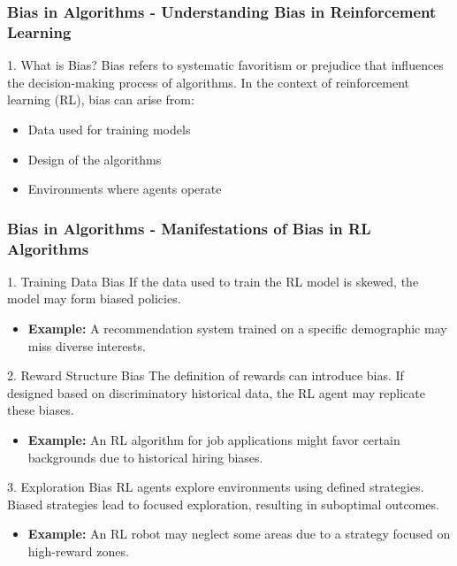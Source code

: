 \documentclass[aspectratio=169]{beamer}
\begin{document}
\begin{frame}[fragile]
  \frametitle{Bias in Algorithms - Understanding Bias in Reinforcement Learning}
  
  \begin{block}{1. What is Bias?}
    Bias refers to systematic favoritism or prejudice that influences the decision-making process of algorithms. In the context of reinforcement learning (RL), bias can arise from:
    \begin{itemize}
      \item Data used for training models
      \item Design of the algorithms
      \item Environments where agents operate
    \end{itemize}
  \end{block}
  
\end{frame}

\begin{frame}[fragile]
  \frametitle{Bias in Algorithms - Manifestations of Bias in RL Algorithms}

  \begin{block}{1. Training Data Bias}
      If the data used to train the RL model is skewed, the model may form biased policies. 
      \begin{itemize}
          \item \textbf{Example:} A recommendation system trained on a specific demographic may miss diverse interests.
      \end{itemize}
  \end{block}

  \begin{block}{2. Reward Structure Bias}
      The definition of rewards can introduce bias. If designed based on discriminatory historical data, the RL agent may replicate these biases.
      \begin{itemize}
          \item \textbf{Example:} An RL algorithm for job applications might favor certain backgrounds due to historical hiring biases.
      \end{itemize}
  \end{block}
  
  \begin{block}{3. Exploration Bias}
      RL agents explore environments using defined strategies. Biased strategies lead to focused exploration, resulting in suboptimal outcomes.
      \begin{itemize}
          \item \textbf{Example:} An RL robot may neglect some areas due to a strategy focused on high-reward zones.
      \end{itemize}
  \end{block}

\end{frame}
\end{document}

